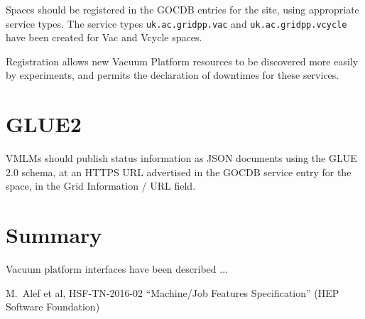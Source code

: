 \documentclass[12pt,a4paper]{article}
\begin{document}
Spaces should be registered in the GOCDB entries for the site, using 
appropriate service types. The service types \texttt{uk.ac.gridpp.vac} and 
\texttt{uk.ac.gridpp.vcycle} have been created for Vac and Vcycle
spaces.

Registration allows new Vacuum Platform resources to be discovered more easily
by experiments, and permits the declaration of downtimes for these services.

\section{GLUE2}
\label{sec:glue2}

VMLMs should publish status information as JSON documents using the GLUE 2.0 
schema, at an HTTPS URL advertised in the GOCDB service entry for the space,
in the Grid Information / URL field.

\clearpage

\section{Summary}
\label{sec:Summary}

Vacuum platform interfaces have been described ...



\begin{thebibliography}{9}


 M.~Alef et al, HSF-TN-2016-02 ``Machine/Job Features Specification'' (HEP Software Foundation)

\end{thebibliography}


\end{document}
